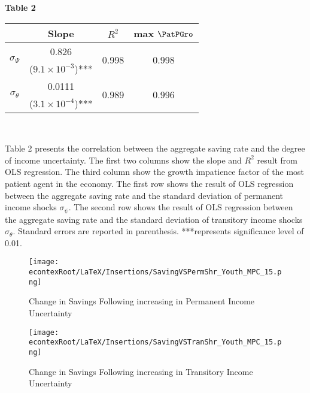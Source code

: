 \begin{table}
	\centerline{\bf Table 2}
	\label{tab:Uncert}
	\begin{center}
		\begin{tabular}{ c c c c }
			\hline
			~ & Slope & $R^2$ & max $\PatPGro$\\
			\hline
			\multirow{2}{4em}{$\sigma_{\Psi}$} & 0.826 & \multirow{2}{*}{0.998} & \multirow{2}{4em}{0.998}\\
			& ($9.1\times10^{-3}$)***\\
			\multirow{2}{4em}{$\sigma_{\theta}$} & 0.0111 & \multirow{2}{*}{0.989} & \multirow{2}{4em}{0.996}\\
			& ($3.1\times10^{-4}$)***\\
			\hline
		\end{tabular}
		\\
	\end{center}
	\begin{tablenotes}
		\small
		\item Table 2 presents the correlation between the aggregate saving rate and the degree of income uncertainty. The first two columns show the slope and $R^2$ result from OLS regression. The third column show the growth impatience factor of the most patient agent in the economy. The first row shows the result of OLS regression between the aggregate saving rate and the standard deviation of permanent income shocks $\sigma_{\psi}$. The second row shows the result of OLS regression between the aggregate saving rate and the standard deviation of transitory income shocks $\sigma_{\theta}$. Standard errors are reported in parenthesis. ***represents significance level of 0.01.
	\end{tablenotes}
\end{table}

\begin{figure}[h]
	\texttt{[image: \\econtexRoot/LaTeX/Insertions/SavingVSPermShr\_Youth\_MPC\_15.png]}
	\centering
	\caption{Change in Savings Following increasing in Permanent Income Uncertainty}
	\label{figure:savings}

	\texttt{[image: \\econtexRoot/LaTeX/Insertions/SavingVSTranShr\_Youth\_MPC\_15.png]}
	\centering
	\caption{Change in Savings Following increasing in Transitory Income Uncertainty}
	\label{figure:savingsTran}
\end{figure}

